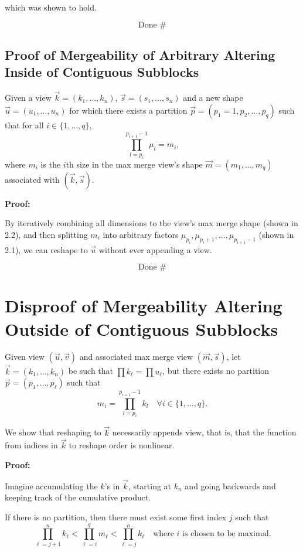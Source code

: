 \documentclass{article}
\begin{document}
which was shown to hold.

\[
\text{Done } \#
\]

\subsection{Proof of Mergeability of Arbitrary Altering Inside of Contiguous Subblocks}

Given a view $\vec{k} = (k_1, \ldots, k_n)$, $\vec{s} = (s_1, \ldots, s_n)$ and a new shape $\vec{u} = (u_1, \ldots, u_n)$ for which there exists a partition $\vec{p} = (p_1 = 1, p_2, \ldots, p_q)$ such that for all $i \in \{1, \ldots, q\}$,
\[
\prod_{l=p_i}^{p_{i+1}-1} \mu_l = m_i,
\]
where $m_i$ is the $i$th size in the max merge view’s shape $\vec{m} = (m_1, \ldots, m_q)$ associated with $(\vec{k}, \vec{s})$.

\textbf{Proof:}

By iteratively combining all dimensions to the view's max merge shape (shown in 2.2), and then splitting $m_i$ into arbitrary factors $\mu_{p_i}, \mu_{p_i+1}, \ldots, \mu_{p_{i+1}-1}$ (shown in 2.1), we can reshape to $\vec{u}$ without ever appending a view.

\[
\text{Done } \#
\]


\section{Disproof of Mergeability Altering Outside of Contiguous Subblocks}

Given view $(\vec{u}, \vec{v})$ and associated max merge view $(\vec{m}, \vec{s})$, let $\vec{k} = (k_1, \ldots, k_n)$ be such that $\prod k_\ell = \prod u_\ell$, but there exists no partition $\vec{p} = (p_1, \ldots, p_\ell)$ such that
\[
m_i = \prod_{l = p_i}^{p_{i+1}-1} k_l \quad \forall i \in \{1, \ldots, q\}.
\]

We show that reshaping to $\vec{k}$ necessarily appends view, that is, that the function from indices in $\vec{k}$ to reshape order is nonlinear.

\textbf{Proof:}

Imagine accumulating the $k$'s in $\vec{k}$, starting at $k_n$ and going backwards and keeping track of the cumulative product.

If there is no partition, then there must exist some first index $j$ such that
\[
\prod_{\ell=j+1}^{n} k_\ell < \prod_{\ell=i}^{q} m_\ell < \prod_{\ell=j}^{n} k_\ell \quad \text{where } i \text{ is chosen to be maximal.}
\]
\end{document}
